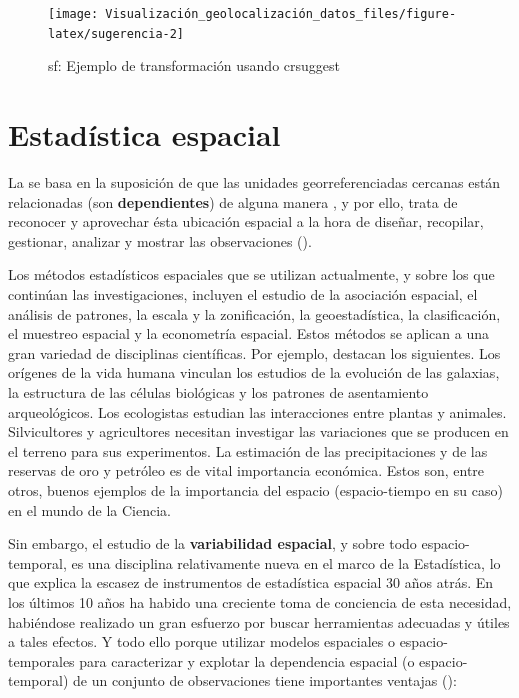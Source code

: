 \documentclass[
]{book}
\theoremstyle{definition}
\theoremstyle{definition}
\theoremstyle{definition}
\theoremstyle{definition}
\theoremstyle{remark}
\begin{document}
\begin{figure}

{\centering \texttt{[image: Visualización\_geolocalización\_datos\_files/figure-latex/sugerencia-2]} 

}

\caption{sf: Ejemplo de transformación usando crsuggest}\label{fig:sugerencia-2}
\end{figure}

\hypertarget{dep-esp}{%
\chapter{Estadística espacial}\label{dep-esp}}

La  se basa en la suposición de que las unidades
georreferenciadas cercanas están relacionadas (son \textbf{dependientes}) de alguna
manera \citep{getis_1999}, y por ello, trata de reconocer y aprovechar ésta ubicación
espacial a la hora de diseñar, recopilar, gestionar, analizar y mostrar las
observaciones (\citet{montero_et_al_2011}).

Los métodos estadísticos espaciales que se utilizan actualmente, y sobre los que
continúan las investigaciones, incluyen el estudio de la asociación espacial, el
análisis de patrones, la escala y la zonificación, la geoestadística, la
clasificación, el muestreo espacial y la econometría espacial. Estos métodos se
aplican a una gran variedad de disciplinas científicas. Por ejemplo,
\citet{montero_et_al_2011} destacan los siguientes. Los orígenes de la vida humana
vinculan los estudios de la evolución de las galaxias, la estructura de las
células biológicas y los patrones de asentamiento arqueológicos. Los ecologistas
estudian las interacciones entre plantas y animales. Silvicultores y
agricultores necesitan investigar las variaciones que se producen en el terreno
para sus experimentos. La estimación de las precipitaciones y de las reservas de
oro y petróleo es de vital importancia económica. Estos son, entre otros, buenos
ejemplos de la importancia del espacio (espacio-tiempo en su caso) en el mundo
de la Ciencia.

Sin embargo, el estudio de la \textbf{variabilidad espacial}, y sobre todo
espacio-temporal, es una disciplina relativamente nueva en el marco de la
Estadística, lo que explica la escasez de instrumentos de estadística espacial
30 años atrás. En los últimos 10 años ha habido una creciente toma de conciencia
de esta necesidad, habiéndose realizado un gran esfuerzo por buscar herramientas
adecuadas y útiles a tales efectos. Y todo ello porque utilizar modelos
espaciales o espacio-temporales para caracterizar y explotar la dependencia
espacial (o espacio-temporal) de un conjunto de observaciones tiene importantes
ventajas (\citet{montero_et_al_2011}):
\end{document}
